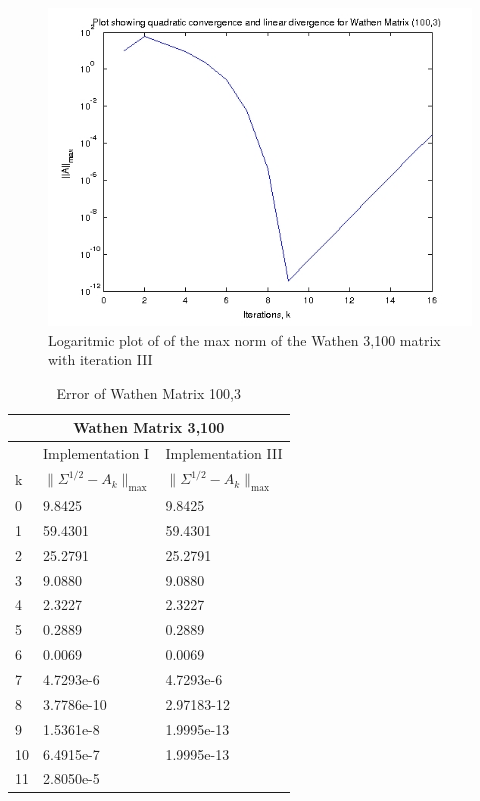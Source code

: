 \begin{center}
\begin{figure}[h!]
\centering
\includegraphics[scale=0.67]{configIII.png}
\caption{Logaritmic plot of of the max norm of the Wathen 3,100 matrix with iteration III}
\label{fig:convergence plot III}
\end{figure}
\end{center}




\begin{table}
\begin{center}
\label{Table: Wathen 100,3}

\begin{tabular}{| l | l | l | }

	\hline
	\multicolumn{3}{|c|}{Wathen Matrix 3,100}  \\
	\hline
	   & Implementation I & Implementation III \\
	k & $\parallel \Sigma^{1/2} - A_{k}\parallel_{\text{max}}$ & $\parallel \Sigma^{1/2} - A_{k}\parallel_{\text{max}}$  \\	
	\hline
	0 & 9.8425 & 9.8425  \\
	1 & 59.4301& 59.4301  \\
	2 & 25.2791& 25.2791   \\
	3 & 9.0880& 9.0880  \\
	4 & 2.3227& 2.3227  \\
	5 & 0.2889& 0.2889  \\
	6 & 0.0069& 0.0069  \\
	7 & 4.7293e-6& 4.7293e-6  \\
	8 & 3.7786e-10& 2.97183-12  \\
	9 & 1.5361e-8& 1.9995e-13  \\
	10& 6.4915e-7 & 1.9995e-13 \\ 
	11& 2.8050e-5 & \\
	\hline
	
\end{tabular}
\end{center}
\caption{Error of Wathen Matrix 100,3}
\end{table}

